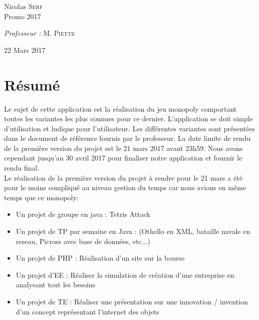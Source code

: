 \documentclass[12pt, openany]{report}
\begin{document}
\begin{titlepage}
\begin{sffamily}
\begin{center}
    \begin{minipage}{0.4\textwidth}
      \begin{flushleft} \large
        Nicolas \textsc{Serf}\\
        Promo 2017\\
      \end{flushleft}
    \end{minipage}
    \begin{minipage}{0.4\textwidth}
      \begin{flushright} \large
        \emph{Professeur :} M. \textsc{Piette}\\
      \end{flushright}
    \end{minipage}

    \vfill

    {\large 22 Mars 2017}

  \end{center}
  \end{sffamily}
\end{titlepage}

\newpage
\section{Résumé}
Le sujet de cette application est la réalisation du jeu monopoly comportant toutes les variantes les plus connues pour ce dernier. L'application se doit simple d'utilisation et ludique pour l'utilisateur. Les différentes variantes sont présentées dans le document de référence fournis par le professeur. La date limite de rendu de la première version du projet est le 21 mars 2017 avant 23h59. Nous avons cependant jusqu'au 30 avril 2017 pour finaliser notre application et fournir le rendu final.\\
Le réalisation de la première version du projet à rendre pour le 21 mars a été pour le moins compliqué au niveau gestion du temps car nous avions en même temps que ce monopoly:
\begin{itemize}
  \item Un projet de groupe en java : Tetris Attack 
  \item Un projet de TP par semaine en Java : (Othello en XML, bataille navale en reseau, Picross avec base de données, etc...)
  \item Un projet de PHP : Réalisation d'un site sur la bourse
  \item Un projet d'EE : Réaliser la simulation de création d'une entreprise en analysant tout les besoins
  \item Un projet de TE : Réaliser une présentation sur une innovation / invention d'un concept représentant l'internet des objets
\end{itemize}
\end{document}
